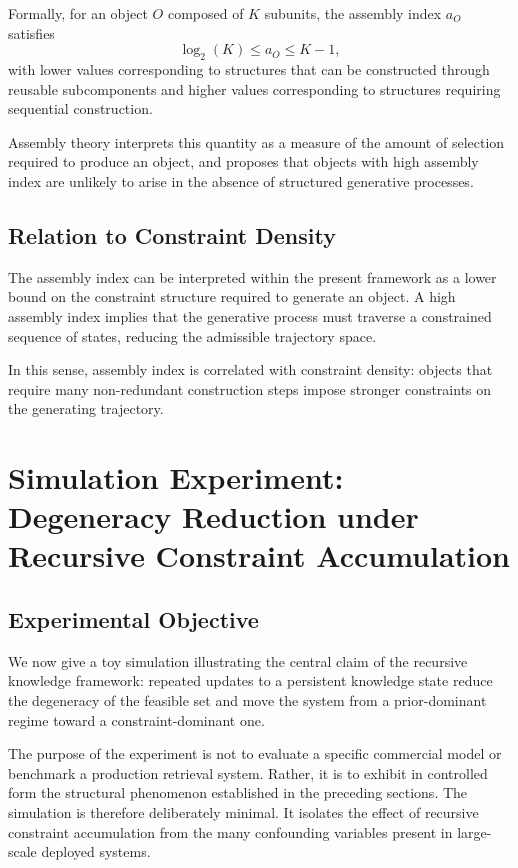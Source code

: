 \documentclass[12pt, oneside]{article}
\theoremstyle{plain}
\theoremstyle{definition}
\theoremstyle{remark}
\begin{document}
Formally, for an object $O$ composed of $K$ subunits, the assembly index $a_O$
satisfies
\[
  \log_2(K) \leq a_O \leq K - 1,
\]
with lower values corresponding to structures that can be constructed through
reusable subcomponents and higher values corresponding to structures requiring
sequential construction.

Assembly theory interprets this quantity as a measure of the amount of selection
required to produce an object, and proposes that objects with high assembly index
are unlikely to arise in the absence of structured generative processes.

\subsection{Relation to Constraint Density}

The assembly index can be interpreted within the present framework as a lower bound
on the constraint structure required to generate an object. A high assembly index
implies that the generative process must traverse a constrained sequence of states,
reducing the admissible trajectory space.

In this sense, assembly index is correlated with constraint density: objects that
require many non-redundant construction steps impose stronger constraints on the
generating trajectory.

\section{Simulation Experiment: Degeneracy Reduction under Recursive Constraint Accumulation}

\subsection{Experimental Objective}

We now give a toy simulation illustrating the central claim of the recursive knowledge framework: repeated updates to a persistent knowledge state reduce the degeneracy of the feasible set and move the system from a prior-dominant regime toward a constraint-dominant one.

The purpose of the experiment is not to evaluate a specific commercial model or benchmark a production retrieval system. Rather, it is to exhibit in controlled form the structural phenomenon established in the preceding sections. The simulation is therefore deliberately minimal. It isolates the effect of recursive constraint accumulation from the many confounding variables present in large-scale deployed systems.
\end{document}
